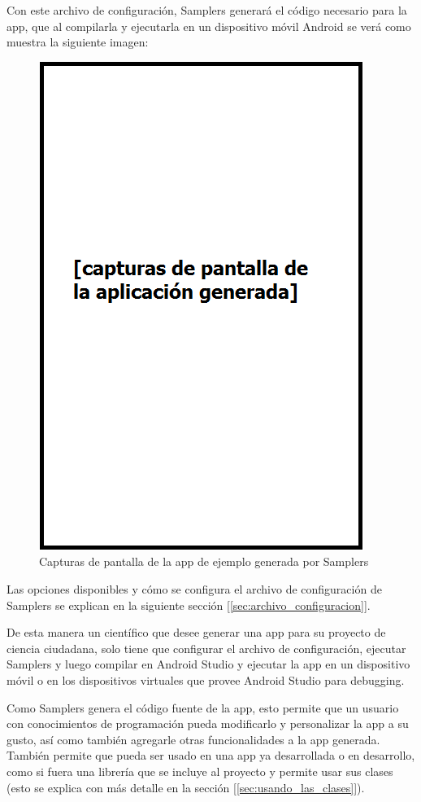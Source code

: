 Con este archivo de configuración, Samplers generará el código necesario para la app, que al compilarla y ejecutarla en un dispositivo móvil Android se verá como muestra la siguiente imagen:


\begin{figure}[H]
  \centering
    \includegraphics[scale=0.8]{05-implementacion/app_generada_ejemplo.png} 
   \caption{Capturas de pantalla de la app de ejemplo generada por Samplers}
\end{figure}


Las opciones disponibles y cómo se configura el archivo de configuración de Samplers se explican en la siguiente sección [\ref{sec:archivo_configuracion}].

De esta manera un científico que desee generar una app para su proyecto de ciencia ciudadana, solo tiene que configurar el archivo de configuración, ejecutar Samplers y luego compilar en Android Studio y ejecutar la app en un dispositivo móvil o en los dispositivos virtuales que provee Android Studio para debugging.

Como Samplers genera el código fuente de la app, esto permite que un usuario con conocimientos de programación pueda modificarlo y personalizar la app a su gusto, así como también agregarle otras funcionalidades a la app generada. También permite que pueda ser usado en una app ya desarrollada o en desarrollo, como si fuera una librería que se incluye al proyecto y permite usar sus clases (esto se explica con más detalle en la sección [\ref{sec:usando_las_clases}]).

